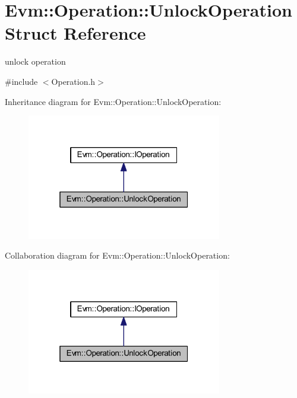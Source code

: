 \hypertarget{struct_evm_1_1_operation_1_1_unlock_operation}{}\section{Evm\+:\+:Operation\+:\+:Unlock\+Operation Struct Reference}
\label{struct_evm_1_1_operation_1_1_unlock_operation}


unlock operation  




{\ttfamily \#include $<$Operation.\+h$>$}



Inheritance diagram for Evm\+:\+:Operation\+:\+:Unlock\+Operation\+:
\nopagebreak
\begin{figure}[H]
\begin{center}
\leavevmode
\includegraphics[width=241pt]{struct_evm_1_1_operation_1_1_unlock_operation__inherit__graph}
\end{center}
\end{figure}


Collaboration diagram for Evm\+:\+:Operation\+:\+:Unlock\+Operation\+:
\nopagebreak
\begin{figure}[H]
\begin{center}
\leavevmode
\includegraphics[width=241pt]{struct_evm_1_1_operation_1_1_unlock_operation__coll__graph}
\end{center}
\end{figure}
